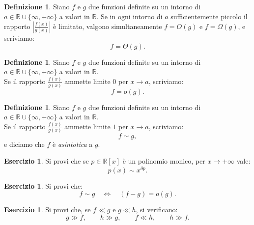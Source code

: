 \documentclass[a4paper,twoside]{article}
\newcommand{\R}{\mathbb{R}}
\theoremstyle{definition}
\newtheorem{definizione}[theorem]{Definizione}
\newtheorem{ex}[theorem]{Esercizio}
\numberwithin{theorem}{section}
\begin{document}
\begin{definizione}
Siano $f$ e $g$ due funzioni definite su un intorno di $a\in\R\cup\{\infty,+\infty\}$ a valori in $\R$. Se in ogni intorno di $a$ sufficientemente piccolo il rapporto $\left|\frac{f(x)}{g(x)}\right|$ è limitato, 
valgono simultaneamente $f=O(g)$ e $f=\Omega(g)$, e scriviamo:
$$ f = \Theta(g). $$
\end{definizione}

\begin{definizione}
Siano $f$ e $g$ due funzioni definite su un intorno di $a\in\R\cup\{\infty,+\infty\}$ a valori in $\R$.\\ Se il rapporto $\frac{f(x)}{g(x)}$ ammette limite $0$ per $x\to a$, scriviamo:
$$ f = o(g).$$ 
\end{definizione}

\begin{definizione}
Siano $f$ e $g$ due funzioni definite su un intorno di $a\in\R\cup\{\infty,+\infty\}$ a valori in $\R$.\\ Se il rapporto $\frac{f(x)}{g(x)}$ ammette limite $1$ per $x\to a$, scriviamo:
$$ f \sim g,$$
e diciamo che $f$ è \emph{asintotica} a $g$. 
\end{definizione}

\begin{framed}
\begin{ex}
Si provi che se $p\in\R[x]$ è un polinomio monico, per $x\to +\infty$ vale:
$$ p(x) \sim x^{\partial p}. $$
\end{ex}
\begin{ex}
Si provi che:
$$ f\sim g\quad\Longleftrightarrow\quad (f-g)=o(g). $$
\end{ex}
\begin{ex}
Si provi che, se $f\ll g$ e $g\ll h$, si verificano:
$$ g\gg f,\qquad h\gg g,\qquad f\ll h,\qquad h\gg f.$$
\end{ex}

\end{framed}
\end{document}
